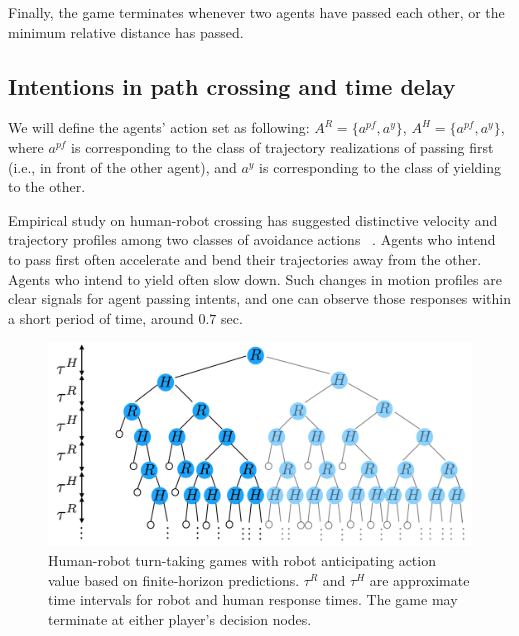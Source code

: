 \documentclass[letterpaper, 10 pt, conference]{ieeeconf}  %
\begin{document}
Finally, the game terminates whenever two agents have passed each other, or the minimum relative distance has passed.

\subsection{Intentions in path crossing and time delay}

We will define the agents' action set as following: $A^R = \{a^{pf}, a^y\}$, $A^H = \{a^{pf},a^y\}$, where $a^{pf}$ is corresponding to the class of trajectory realizations of passing first (i.e., in front of the other agent), and $a^y$ is corresponding to the class of yielding to the other. 

Empirical study on human-robot crossing has suggested distinctive velocity and trajectory profiles among two classes of avoidance actions ~\cite{paris2007pedestrian}. Agents who intend to pass first often accelerate and bend their trajectories away from the other. Agents who intend to yield often slow down. Such changes in motion profiles are clear signals for agent passing intents, and one can observe those responses within a short period of time, around $0.7$ sec.

\begin{figure}[t]
      \centering
      \vspace{-1em}
      \includegraphics[scale=0.2]{turn_taking}
      \vspace{-1.4em}
      \caption{
        Human-robot turn-taking games with robot anticipating action value based on finite-horizon predictions. $\tau^R$ and $\tau^H$ are approximate time intervals for robot and human response times. The game may terminate at either player's decision nodes.}
      \vspace{-1.7em}
     \label{fig:turn_taking}
\end{figure}
\end{document}
